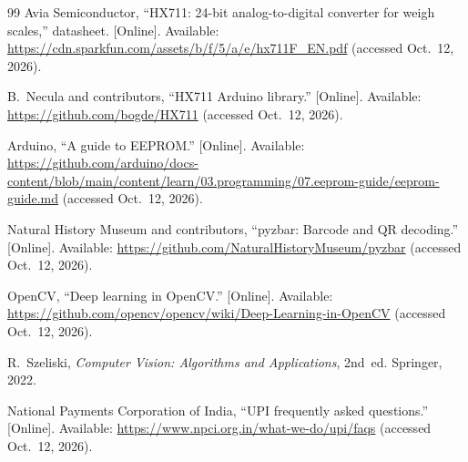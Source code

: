 \documentclass[conference]{IEEEtran}
\begin{document}
\begin{thebibliography}{99}
 Avia Semiconductor, ``HX711: 24-bit analog-to-digital converter for weigh scales,''
datasheet. [Online]. Available: \url{https://cdn.sparkfun.com/assets/b/f/5/a/e/hx711F_EN.pdf}
(accessed Oct.~12, 2026).

 B.~Necula and contributors, ``HX711 Arduino library.'' [Online]. Available:
\url{https://github.com/bogde/HX711} (accessed Oct.~12, 2026).

 Arduino, ``A guide to EEPROM.'' [Online]. Available:
\url{https://github.com/arduino/docs-content/blob/main/content/learn/03.programming/07.eeprom-guide/eeprom-guide.md}
(accessed Oct.~12, 2026).

 Natural History Museum and contributors, ``pyzbar: Barcode and QR decoding.'' [Online].
Available: \url{https://github.com/NaturalHistoryMuseum/pyzbar} (accessed Oct.~12, 2026).

 OpenCV, ``Deep learning in OpenCV.'' [Online]. Available:
\url{https://github.com/opencv/opencv/wiki/Deep-Learning-in-OpenCV} (accessed Oct.~12, 2026).

 R.~Szeliski, \emph{Computer Vision: Algorithms and Applications}, 2nd~ed. Springer,
2022.

 National Payments Corporation of India, ``UPI frequently asked questions.'' [Online].
Available: \url{https://www.npci.org.in/what-we-do/upi/faqs} (accessed Oct.~12, 2026).

\end{thebibliography}
\end{document}
